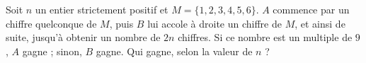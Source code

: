 Soit $n$ un entier strictement positif et $M = \{1, 2, 3, 4, 5, 6\}$. $A$ commence par un chiffre quelconque de $M$, puis $B$ lui accole à droite un chiffre de $M$, et ainsi de suite, jusqu'à obtenir un nombre de $2n$ chiffres. Si ce nombre est un multiple de $9$, $A$ gagne ; sinon, $B$ gagne. Qui gagne, selon la valeur de $n$ ?
